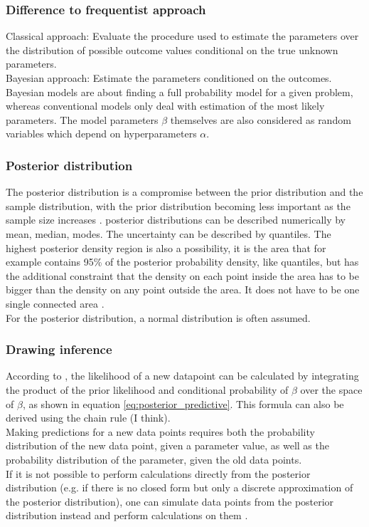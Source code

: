 \documentclass{article}
\begin{document}
\subsubsection{Difference to frequentist approach}
Classical approach: Evaluate the procedure used to estimate the parameters over the distribution of possible outcome values conditional on the true unknown parameters.
\\
Bayesian approach: Estimate the parameters conditioned on the outcomes.
\cite{1439840954}
\\
Bayesian models are about finding a full probability model for a given problem, whereas conventional models only deal with estimation of the most likely parameters.
The model parameters $\beta$ themselves are also considered as random variables which depend on hyperparameters $\alpha$.

\subsubsection{Posterior distribution}

The posterior distribution is a compromise between the prior distribution and the sample distribution, with the prior distribution becoming less important as the sample size increases \cite{1439840954}.
posterior distributions can be described numerically by mean, median, modes. The uncertainty can be described by quantiles. The highest posterior density region is also a possibility, it is the area that for example contains 95\% of the posterior probability density, like quantiles, but has the additional constraint that the density on each point inside the area has to be bigger than the density on any point outside the area. It does not have to be one single connected area  \cite{1439840954}.
\\
For the posterior distribution, a normal distribution is often assumed.

\subsubsection{Drawing inference}
According to \cite{Wang2018}, the likelihood of a new datapoint can be calculated by integrating the product of the prior likelihood and conditional probability of $\beta$ over the space of $\beta$, as shown in equation \ref{eq:posterior_predictive}. This formula can also be derived using the chain rule (I think).
\\
Making predictions for a new data points requires both the probability distribution of the new data point, given a parameter value, as well as the probability distribution of the parameter, given the old data points.
\\
If it is not possible to perform calculations directly from the posterior distribution (e.g. if there is no closed form but only a discrete approximation of the posterior distribution), one can simulate data points from the posterior distribution instead and perform calculations on them \cite{1439840954}.
\end{document}
